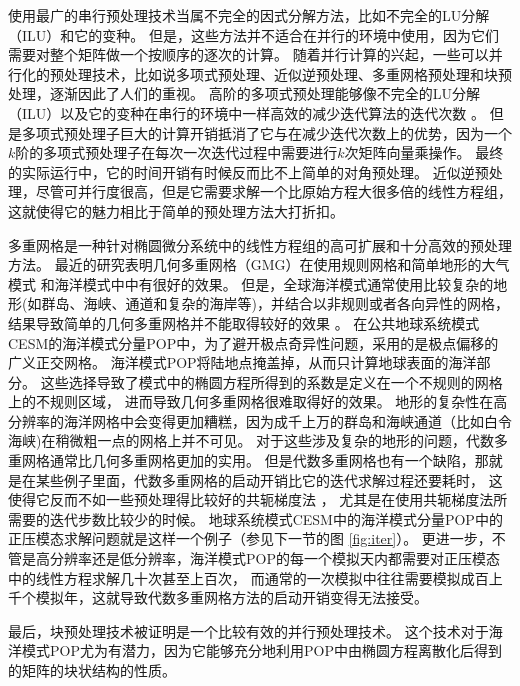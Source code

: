 使用最广的串行预处理技术当属不完全的因式分解方法，比如不完全的LU分解（ILU）和它的变种\cite{benzi2002preconditioning}。 
但是，这些方法并不适合在并行的环境中使用，因为它们需要对整个矩阵做一个按顺序的逐次的计算。 
随着并行计算的兴起，一些可以并行化的预处理技术，比如说多项式预处理、近似逆预处理、多重网格预处理和块预处理，逐渐因此了人们的重视。 
高阶的多项式预处理能够像不完全的LU分解（ILU）以及它的变种在串行的环境中一样高效的减少迭代算法的迭代次数\cite{benzi2002preconditioning} 。 
但是多项式预处理子巨大的计算开销抵消了它与在减少迭代次数上的优势，因为一个$k$阶的多项式预处理子在每次一次迭代过程中需要进行$k$次矩阵向量乘操作。 
最终的实际运行中，它的时间开销有时候反而比不上简单的对角预处理\cite{meyer1989numerical,smith1992parallel}。
近似逆预处理，尽管可并行度很高，但是它需要求解一个比原始方程大很多倍的线性方程组\cite{smith1992parallel,bergamaschi2007numerical}， 这就使得它的魅力相比于简单的预处理方法大打折扣。

 
 
多重网格是一种针对椭圆微分系统中的线性方程组的高可扩展和十分高效的预处理方法。 
最近的研究表明几何多重网格（GMG）在使用规则网格和简单地形的大气模式
 \cite{muller2014massively}
 和海洋模式中\cite{matsumura2008non,kanarska2007algorithm}中有很好的效果。 
 但是，全球海洋模式通常使用比较复杂的地形(如群岛、海峡、通道和复杂的海岸等)，并结合以非规则或者各向异性的网格， 结果导致简单的几何多重网格并不能取得较好的效果
\cite{matsumura2008non,fulton1986multigrid,tseng2003ghost,stuben2001review}。 
在公共地球系统模式CESM的海洋模式分量POP中，为了避开极点奇异性问题，采用的是极点偏移的广义正交网格。 
海洋模式POP将陆地点掩盖掉，从而只计算地球表面的海洋部分。
这些选择导致了模式中的椭圆方程所得到的系数是定义在一个不规则的网格上的不规则区域， 进而导致几何多重网格很难取得好的效果。 
地形的复杂性在高分辨率的海洋网格中会变得更加糟糕，因为成千上万的群岛和海峡通道（比如白令海峡)在稍微粗一点的网格上并不可见。
对于这些涉及复杂的地形的问题，代数多重网格通常比几何多重网格更加的实用。 
但是代数多重网格也有一个缺陷，那就是在某些例子里面，代数多重网格的启动开销比它的迭代求解过程还要耗时，
这使得它反而不如一些预处理得比较好的共轭梯度法
\cite{muller2014massively}， 尤其是在使用共轭梯度法所需要的迭代步数比较少的时候。 
地球系统模式CESM中的海洋模式分量POP中的正压模态求解问题就是这样一个例子（参见下一节的图
 \ref{fig:iter}）。
更进一步，不管是高分辨率还是低分辨率，海洋模式POP的每一个模拟天内都需要对正压模态中的线性方程求解几十次甚至上百次，
而通常的一次模拟中往往需要模拟成百上千个模拟年，这就导致代数多重网格方法的启动开销变得无法接受。


最后，块预处理技术被证明是一个比较有效的并行预处理技术\cite{concus1985block, white2011block}。
这个技术对于海洋模式POP尤为有潜力，因为它能够充分地利用POP中由椭圆方程离散化后得到的矩阵的块状结构的性质。 

